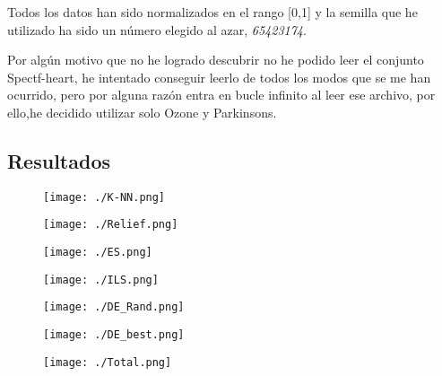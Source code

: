 \documentclass[14pt]{article}
\begin{document}
Todos los datos han sido normalizados en el rango [0,1] y la semilla que he utilizado ha sido un número elegido al azar, \textit{65423174}. 

Por algún motivo que no he logrado descubrir no he podido leer el conjunto Spectf-heart, he intentado conseguir leerlo de todos los modos que se me han ocurrido, pero por alguna razón entra en bucle infinito al leer ese archivo, por ello,he decidido utilizar solo Ozone y Parkinsons.

\subsection{Resultados}

\begin{figure}[htb]
	\begin{center}
		\texttt{[image: ./K-NN.png]}
	\end{center}
\end{figure}

\begin{figure}[htb]
	\begin{center}
		\texttt{[image: ./Relief.png]}
	\end{center}
\end{figure}

\begin{figure}[htb]
	\begin{center}
		\texttt{[image: ./ES.png]}
	\end{center}
\end{figure}
\newpage
\begin{figure}[htb]
	\begin{center}
		\texttt{[image: ./ILS.png]}
	\end{center}
\end{figure}

\begin{figure}[htb]
	\begin{center}
		\texttt{[image: ./DE\_Rand.png]}
	\end{center}
\end{figure}

\begin{figure}[htb]
	\begin{center}
		\texttt{[image: ./DE\_best.png]}
	\end{center}
\end{figure}

\newpage

\begin{figure}[htb]
	\begin{center}
		\texttt{[image: ./Total.png]}
	\end{center}
\end{figure}
\end{document}
